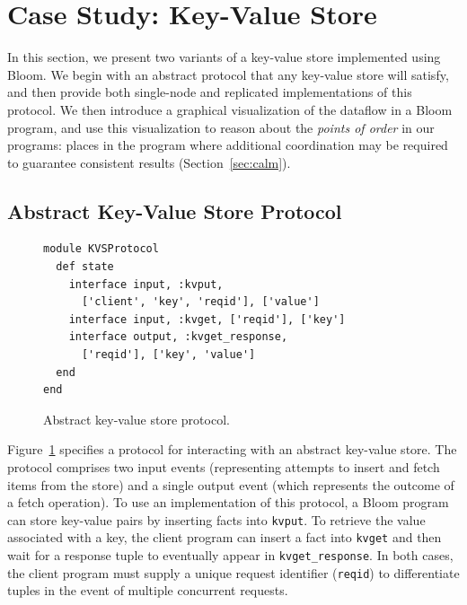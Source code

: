 \section{Case Study: Key-Value Store}
In this section, we present two variants of a key-value store implemented using
Bloom. We begin with an abstract protocol that any key-value store will satisfy,
and then provide both single-node and replicated implementations of this
protocol. We then introduce a graphical visualization of the dataflow in a Bloom
program, and use this visualization to reason about the \emph{points of order}
in our programs: places in the program where additional coordination may be
required to guarantee consistent results (Section~\ref{sec:calm}).

\subsection{Abstract Key-Value Store Protocol}

\begin{figure}[t]
\begin{scriptsize}
\begin{lstlisting}
module KVSProtocol
  def state
    interface input, :kvput, 
      ['client', 'key', 'reqid'], ['value']
    interface input, :kvget, ['reqid'], ['key']
    interface output, :kvget_response, 
      ['reqid'], ['key', 'value']
  end
end
\end{lstlisting}
\centering
\vspace{-10pt}
\caption{Abstract key-value store protocol.}
\label{fig:kvs-proto}
\end{scriptsize}
\vspace{-2pt}
\end{figure}

Figure~\ref{fig:kvs-proto} specifies a protocol for interacting with an abstract
key-value store. The protocol comprises two input events (representing attempts
to insert and fetch items from the store) and a single output event (which
represents the outcome of a fetch operation). To use an implementation of this
protocol, a Bloom program can store key-value pairs by inserting facts into
\texttt{kvput}. To retrieve the value associated with a key, the client program
can insert a fact into \texttt{kvget} and then wait for a response tuple to
eventually appear in \texttt{kvget\_response}. In both cases, the client program
must supply a unique request identifier (\texttt{reqid}) to differentiate tuples
in the event of multiple concurrent requests.

